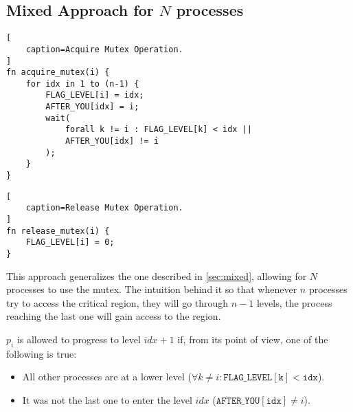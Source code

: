 \subsection{Mixed Approach for $N$ processes}

\begin{lstlisting}[
    caption=Acquire Mutex Operation.
]
fn acquire_mutex(i) {
    for idx in 1 to (n-1) {
        FLAG_LEVEL[i] = idx;
        AFTER_YOU[idx] = i;
        wait(
            forall k != i : FLAG_LEVEL[k] < idx ||
            AFTER_YOU[idx] != i
        );
    }
}
\end{lstlisting}

\begin{lstlisting}[
    caption=Release Mutex Operation.
]
fn release_mutex(i) {
    FLAG_LEVEL[i] = 0;
}
\end{lstlisting}

This approach generalizes the one described in \autoref{sec:mixed},
allowing for $N$ processes to use the mutex.
The intuition behind it so that whenever $n$ processes try to access the critical region,
they will go through $n-1$ levels, the process reaching the last one will gain access to the region.

$p_i$ is allowed to progress to level $idx + 1$ if, from its point of view, one of the following is true:
\begin{itemize}
    \item All other processes are at a lower level ($\forall k \neq i : \mathtt{FLAG\_LEVEL[k] < idx}$).
    \item It was not the last one to enter the level $idx$ ($\mathtt{AFTER\_YOU[idx]} \neq i$).
\end{itemize}
